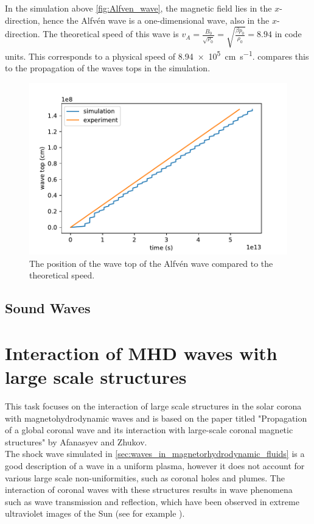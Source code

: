 \documentclass{article}
\begin{document}
In the simulation above \cref{fig:Alfven_wave}, the magnetic field lies in the $x$-direction, hence the Alfv\'en wave is a one-dimensional wave, also in the $x$-direction. 
The theoretical speed of this wave is $v_A = \frac{B_0}{\sqrt{\rho_0}} = \sqrt{\frac{\beta p_0}{\rho_0}} = 8.94$ in code units. 
This corresponds to a physical speed of \SI{8.94e5}{\centi\meter\per\second}.
 compares this to the propagation of the waves tops in the simulation.
\begin{figure}[H]
	\centering
	\includegraphics[width=.6\textwidth]{figures/alven_wave_position.pdf}
	\caption{The position of the wave top of the Alfv\'en wave compared to the theoretical speed.}
	\label{fig:alven_wave_speed}
\end{figure}
\subsection{Sound Waves}
\section{Interaction of MHD waves with large scale structures}
This task focuses on the interaction of large scale structures in the solar corona with magnetohydrodynamic waves and is based on the paper titled "Propagation of a global coronal wave and its interaction with large-scale coronal magnetic structures" by Afanasyev and Zhukov.  \cite{afanasyev2018propagation}\\

The shock wave simulated in \cref{sec:waves_in_magnetorhydrodynamic_fluids} is a good description of a wave in a uniform plasma, however it does not account for various large scale non-uniformities, such as coronal holes and plumes. The interaction of coronal waves with these structures results in wave phenomena such as wave transmission and reflection, which have been observed in extreme ultraviolet images of the Sun (see for example \cite{gopalswamy2009euv}).
\end{document}

